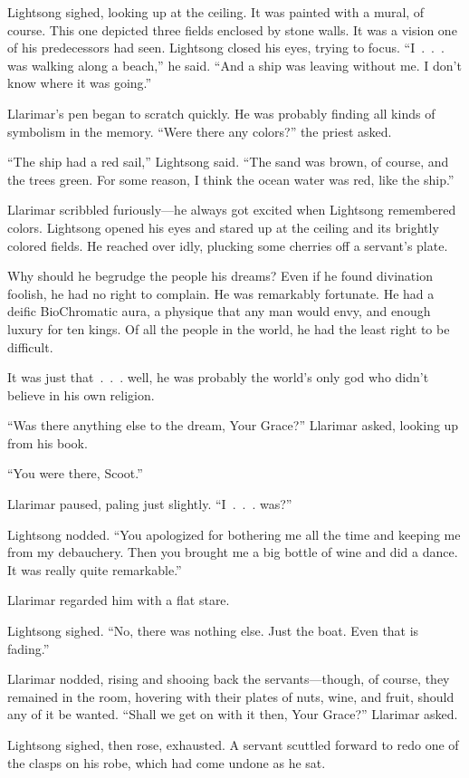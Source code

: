 Lightsong sighed, looking up at the ceiling. It was painted with a mural, of course. This one depicted three fields enclosed by stone walls. It was a vision one of his predecessors had seen. Lightsong closed his eyes, trying to focus. “I~.~.~. was walking along a beach,” he said. “And a ship was leaving without me. I don’t know where it was going.”

Llarimar’s pen began to scratch quickly. He was probably finding all kinds of symbolism in the memory. “Were there any colors?” the priest asked.

“The ship had a red sail,” Lightsong said. “The sand was brown, of course, and the trees green. For some reason, I think the ocean water was red, like the ship.”

Llarimar scribbled furiously—he always got excited when Lightsong remembered colors. Lightsong opened his eyes and stared up at the ceiling and its brightly colored fields. He reached over idly, plucking some cherries off a servant’s plate.

Why should he begrudge the people his dreams? Even if he found divination foolish, he had no right to complain. He was remarkably fortunate. He had a deific BioChromatic aura, a physique that any man would envy, and enough luxury for ten kings. Of all the people in the world, he had the least right to be difficult.

It was just that~.~.~. well, he was probably the world’s only god who didn’t believe in his own religion.

“Was there anything else to the dream, Your Grace?” Llarimar asked, looking up from his book.

“You were there, Scoot.”

Llarimar paused, paling just slightly. “I~.~.~. was?”

Lightsong nodded. “You apologized for bothering me all the time and keeping me from my debauchery. Then you brought me a big bottle of wine and did a dance. It was really quite remarkable.”

Llarimar regarded him with a flat stare.

Lightsong sighed. “No, there was nothing else. Just the boat. Even that is fading.”

Llarimar nodded, rising and shooing back the servants—though, of course, they remained in the room, hovering with their plates of nuts, wine, and fruit, should any of it be wanted. “Shall we get on with it then, Your Grace?” Llarimar asked.

Lightsong sighed, then rose, exhausted. A servant scuttled forward to redo one of the clasps on his robe, which had come undone as he sat.

